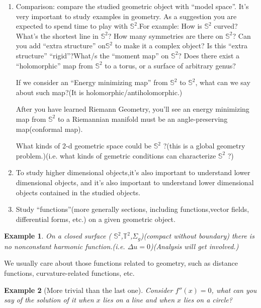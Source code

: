 \documentclass[UTF8,oneside,11pt]{book}
\theoremstyle{plain}\newtheorem{thm}{Theorem}
\theoremstyle{definition}\newtheorem{defn}[thm]{Definition}
\theoremstyle{plain}\newtheorem{axiom}[thm]{Axiom}
\theoremstyle{plain}\newtheorem{coro}[thm]{Corollary}
\theoremstyle{plain}\newtheorem{lemma}[thm]{Lemma}
\theoremstyle{plain}\newtheorem{prop}[thm]{Proposition}
\theoremstyle{plain}\newtheorem{conj}[thm]{Conjecture}
\theoremstyle{plain}\newtheorem{ques}[thm]{Problem}
\theoremstyle{plain}\newtheorem{const}[thm]{Construction}
\theoremstyle{remark}\newtheorem{notation}[thm]{Notation}
\theoremstyle{plain}\newtheorem*{app}{Application}
\theoremstyle{plain}\newtheorem*{exam}{Example}
\theoremstyle{plain}\newtheorem*{exer}{Exercise}
\theoremstyle{remark}\newtheorem*{remark}{Remark}
\theoremstyle{remark}\newtheorem*{note}{\small{Note}}
\numberwithin{equation}{section}
\numberwithin{thm}{section}
\begin{document}
\begin{enumerate}[1)]
    \item Comparison: compare the studied geometric object with ``model space''. It's very important to study examples in geometry. As a suggestion you are expected to spend time to play with $\mathbb{S}^2$.For example: How is $\mathbb{S}^2$ curved? What's the shortest line in $\mathbb{S}^2$? How many symmetries are there on $\mathbb{S}^2$? Can you add ``extra structure'' on$\mathbb{S}^2$ to make it a complex object? Is this ``extra structure'' ``rigid''?What/s the ``moment map'' on $\mathbb{S}^2$? Does there exist a ``holomorphic'' map from $\mathbb{S}^2$ to a torus, or a surface of arbitrary genus? \par 
    If we consider an ``Energy minimizing map'' from $\mathbb{S}^2$ to $\mathbb{S}^2$, what can we say about such map?(It is  holomorphic/antiholomorphic.)\par 
    After you have learned Riemann Geometry, you'll see an energy minimizing map from $\mathbb{S}^2$ to a Riemannian manifold must be an angle-preserving map(conformal map).\par 
    What kinds of 2-d geometric space could be $\mathbb{S}^2$ ?(this is a global geometry problem.)(i.e. what kinds of gemetric conditions can characterize $\mathbb{S}^2$ ?)
    \item To study higher dimensional objects,it's also important to understand lower dimensional objects, and it's also important to understand lower dimensional objects contained in the studied objects.
    \item Study ``functions''(more generally sections, including functions,vector fields, differential forms, etc.) on a given geometric object.
\end{enumerate}
\begin{exam}
    On a closed surface ( $\mathbb{S}^2$,$\mathbb{T}^2$,$\Sigma_g$)(compact without boundary) there is no nonconstant harmonic function.(i.e. $\Delta u=0$)(Analysis will get involved.)
\end{exam}
We usually care about those functions related to geometry, such as distance functions, curvature-related functions, etc.
\begin{exam}[More trivial than the last one]
    Consider $f''\left(x\right)=0$, what can you say of the solution of it when $x$ lies on a line and when $x$ lies on a circle?
\end{exam}
\tableofcontents
\newpage

\end{document}
